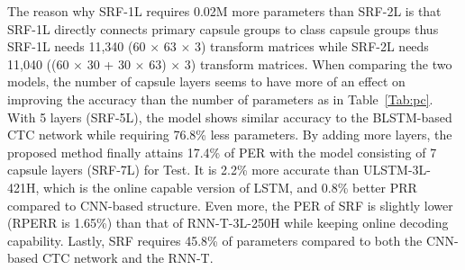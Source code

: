 \documentclass[review]{elsarticle}
\begin{document}
The reason why SRF-1L requires 0.02M more parameters than SRF-2L is that SRF-1L directly connects primary capsule groups to class capsule groups thus SRF-1L needs 11,340 (60 $\times$ 63 $\times$ 3) transform matrices while SRF-2L needs 11,040 ((60 $\times$ 30 + 30 $\times$ 63) $\times$ 3) transform matrices.
When comparing the two models, the number of capsule layers seems to have more of an effect on improving the accuracy than the number of parameters as in Table~\ref{Tab:pc}.
With 5 layers (SRF-5L), the model shows similar accuracy to the BLSTM-based CTC network while requiring 76.8\% less parameters.
By adding more layers, the proposed method finally attains 17.4\% of PER with the model consisting of 7 capsule layers (SRF-7L) for Test.
It is 2.2\% more accurate than ULSTM-3L-421H, which is the online capable version of LSTM, and 0.8\% better PRR compared to CNN-based structure.
Even more, the PER of SRF is slightly lower (RPERR is 1.65\%) than that of RNN-T-3L-250H while keeping online decoding capability. 
Lastly, SRF requires 45.8\% of parameters compared to both the CNN-based CTC network and the RNN-T.
\end{document}
